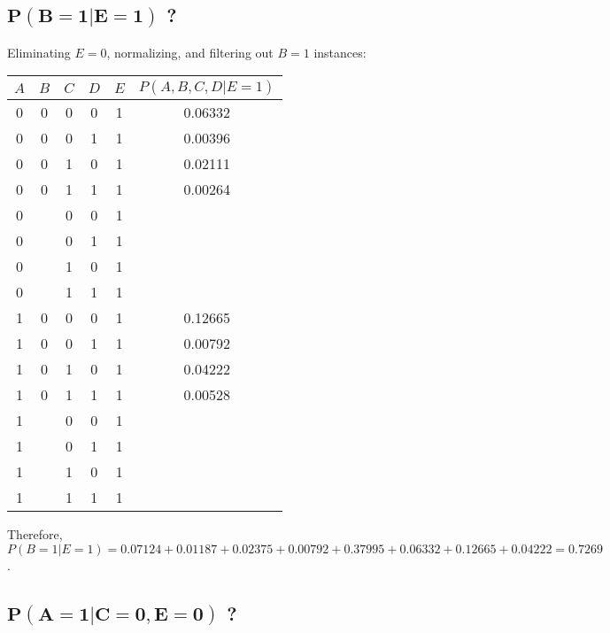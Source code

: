 \documentclass{homework}
\begin{document}
\clearpage
\subsection{$\mathbf{P(B = 1 | E = 1)}$ \textbf{?}}

Eliminating $E = 0$, normalizing, and filtering out $B = 1$ instances:

\begin{table}[h!]
    \centering
    \begin{tabular}{ccccc|c}
        $A$ & $B$ & $C$ & $D$ & $E$ & $P(A, B, C, D | E = 1)$ \\
        \midrule
        0 & 0 & 0 & 0 & 1 & 0.06332 \\
        0 & 0 & 0 & 1 & 1 & 0.00396 \\
        0 & 0 & 1 & 0 & 1 & 0.02111 \\
        0 & 0 & 1 & 1 & 1 & 0.00264 \\
        0 & \color{red}{1} & 0 & 0 & 1 & \color{red}{0.07124} \\
        0 & \color{red}{1} & 0 & 1 & 1 & \color{red}{0.01187} \\
        0 & \color{red}{1} & 1 & 0 & 1 & \color{red}{0.02375} \\
        0 & \color{red}{1} & 1 & 1 & 1 & \color{red}{0.00792} \\
        1 & 0 & 0 & 0 & 1 & 0.12665 \\
        1 & 0 & 0 & 1 & 1 & 0.00792 \\
        1 & 0 & 1 & 0 & 1 & 0.04222 \\
        1 & 0 & 1 & 1 & 1 & 0.00528 \\
        1 & \color{red}{1} & 0 & 0 & 1 & \color{red}{0.37995} \\
        1 & \color{red}{1} & 0 & 1 & 1 & \color{red}{0.06332} \\
        1 & \color{red}{1} & 1 & 0 & 1 & \color{red}{0.12665} \\
        1 & \color{red}{1} & 1 & 1 & 1 & \color{red}{0.04222} \\
    \end{tabular}
\end{table}

Therefore, $P(B = 1 | E = 1) = 0.07124 + 0.01187 + 0.02375 + 0.00792 + 0.37995 + 0.06332 + 0.12665 + 0.04222 = \mathbf{0.7269}$.

\subsection{$\mathbf{P(A = 1 | C = 0, E = 0)}$ \textbf{?}}
\end{document}

